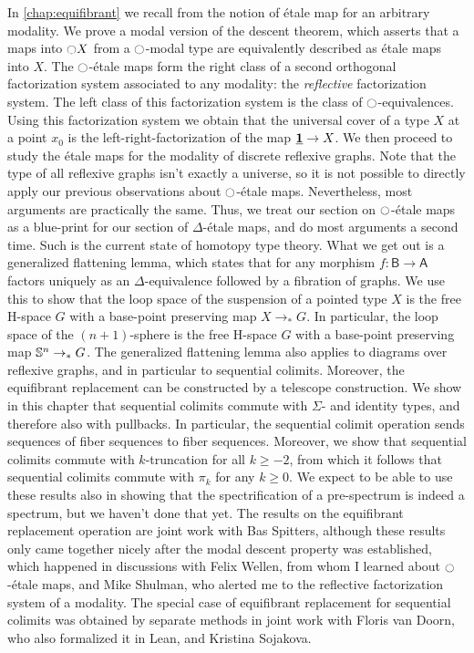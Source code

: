 In \cref{chap:equifibrant} we recall from \cite{WellenPhD} the notion of \'etale map for an arbitrary modality. We prove a modal version of the descent theorem, which asserts that a maps into ${\ocircle} X$ from a ${\ocircle}$-modal type are equivalently described as \'etale maps into $X$. The ${\ocircle}$-\'etale maps form the right class of a second orthogonal factorization system associated to any modality: the \emph{reflective} factorization system. The left class of this factorization system is the class of ${\ocircle}$-equivalences. Using this factorization system we obtain that the universal cover of a type $X$ at a point $x_0$ is the left-right-factorization of the map $\underline{\mathbf{1}}\to X$. 
We then proceed to study the \'etale maps for the modality of discrete reflexive graphs. Note that the type of all reflexive graphs isn't exactly a universe, so it is not possible to directly apply our previous observations about ${\ocircle}$-\'etale maps. Nevertheless, most arguments are practically the same. Thus, we treat our section on ${\ocircle}$-\'etale maps as a blue-print for our section of $\Delta$-\'etale maps, and do most arguments a second time. Such is the current state of homotopy type theory. What we get out is a generalized flattening lemma, which states that for any morphism $f:\mathsf{B}\to\mathsf{A}$ factors uniquely as an $\Delta$-equivalence followed by a fibration of graphs. We use this to show that the loop space of the suspension of a pointed type $X$ is the free H-space $G$ with a base-point preserving map $X\to_\ast G$. In particular, the loop space of the $(n+1)$-sphere is the free H-space $G$ with a base-point preserving map $\mathbb{S}^{n}\to_\ast G$. 
The generalized flattening lemma also applies to diagrams over reflexive graphs, and in particular to sequential colimits. Moreover, the equifibrant replacement can be constructed by a telescope construction. We show in this chapter that sequential colimits commute with $\Sigma$- and identity types, and therefore also with pullbacks. In particular, the sequential colimit operation sends sequences of fiber sequences to fiber sequences. Moreover, we show that sequential colimits commute with $k$-truncation for all $k\geq -2$, from which it follows that sequential colimits commute with $\pi_k$ for any $k\geq 0$. We expect to be able to use these results also in showing that the spectrification of a pre-spectrum is indeed a spectrum, but we haven't done that yet.
The results on the equifibrant replacement operation are joint work with Bas Spitters, although these results only came together nicely after the modal descent property was established, which happened in discussions with Felix Wellen, from whom I learned about ${\ocircle}$-\'etale maps, and Mike Shulman, who alerted me to the reflective factorization system of a modality. The special case of equifibrant replacement for sequential colimits was obtained by separate methods in joint work with Floris van Doorn, who also formalized it in Lean, and Kristina Sojakova.

